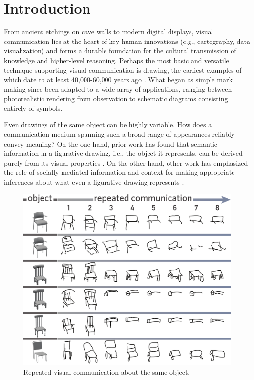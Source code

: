 \documentclass[10pt,letterpaper]{article}
\begin{document}
\section{Introduction}

From ancient etchings on cave walls to modern digital displays, visual communication lies at the heart of key human innovations (e.g., cartography, data visualization) and forms a durable foundation for the cultural transmission of knowledge and higher-level reasoning.
Perhaps the most basic and versatile technique supporting visual communication is drawing, the earliest examples of which date to at least 40,000-60,000 years ago \cite{hoffmann2018u}. 
What began as simple mark making since been adapted to a wide array of applications, ranging between photorealistic rendering from observation to schematic diagrams consisting entirely of symbols.

Even drawings of the same object can be highly variable.
How does a communication medium spanning such a broad range of appearances reliably convey meaning?
On the one hand, prior work has found that semantic information in a figurative drawing, i.e., the object it represents, can be derived purely from its visual properties \cite{FanCommon2018}.
On the other hand, other work has emphasized the role of socially-mediated information and context for making appropriate inferences about what even a figurative drawing represents \cite{goodman1976languages}.

\begin{figure}
\includegraphics[width=0.99\linewidth]{figures/sketch_gallery.pdf}
\caption{Repeated visual communication about the same object.}
\label{sketch_gallery}
\end{figure}
\end{document}
